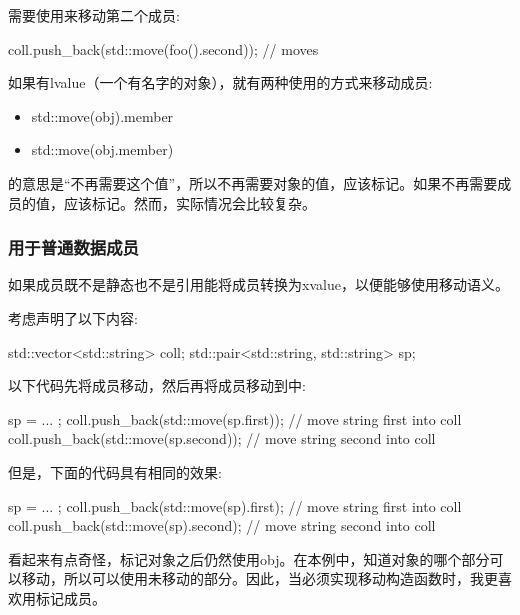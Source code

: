 需要使用来移动第二个成员:

\begin{cppcode}
coll.push_back(std::move(foo().second)); // moves
\end{cppcode}

如果有lvalue（一个有名字的对象），就有两种使用的方式来移动成员:

\begin{itemize}
	\item std::move(obj).member
	\item std::move(obj.member)
\end{itemize}

的意思是“不再需要这个值”，所以不再需要对象的值，应该标记。如果不再需要成员的值，应该标记。然而，实际情况会比较复杂。

\subsubsection{用于普通数据成员}

如果成员既不是静态也不是引用能将成员转换为xvalue，以便能够使用移动语义。

考虑声明了以下内容:

\begin{cppcode}
std::vector<std::string> coll;
std::pair<std::string, std::string> sp;
\end{cppcode}

以下代码先将成员移动，然后再将成员移动到中:

\begin{cppcode}
sp = ... ;
coll.push_back(std::move(sp.first)); // move string first into coll
coll.push_back(std::move(sp.second)); // move string second into coll
\end{cppcode}

但是，下面的代码具有相同的效果:

\begin{cppcode}
sp = ... ;
coll.push_back(std::move(sp).first); // move string first into coll
coll.push_back(std::move(sp).second); // move string second into coll
\end{cppcode}

看起来有点奇怪，标记对象之后仍然使用obj。在本例中，知道对象的哪个部分可以移动，所以可以使用未移动的部分。因此，当必须实现移动构造函数时，我更喜欢用标记成员。


